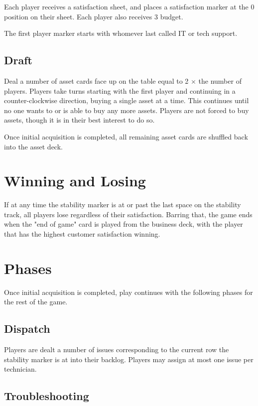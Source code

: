 \documentclass[twocolumn]{article}
\begin{document}
Each player receives a satisfaction sheet, and places a satisfaction marker at the 0 position on their sheet. Each player also receives 3 budget.

The first player marker starts with whomever last called IT or tech support.

\subsection*{Draft}

Deal a number of asset cards face up on the table equal to 2 $\times$ the number of players. Players take turns starting with the first player and continuing in a counter-clockwise direction, buying a single asset at a time. This continues until no one wants to or is able to buy any more assets. Players are not forced to buy assets, though it is in their best interest to do so.

Once initial acquisition is completed, all remaining asset cards are shuffled back into the asset deck.

\section*{Winning and Losing}

If at any time the stability marker is at or past the last space on the stability track, all players lose regardless of their satisfaction. Barring that, the game ends when the "end of game" card is played from the business deck, with the player that has the highest customer satisfaction winning.

\section*{Phases}

Once initial acquisition is completed, play continues with the following phases for the rest of the game.

\subsection*{Dispatch}

Players are dealt a number of issues corresponding to the current row the stability marker is at into their backlog. Players may assign at most one issue per technician.

\subsection*{Troubleshooting}
\end{document}
